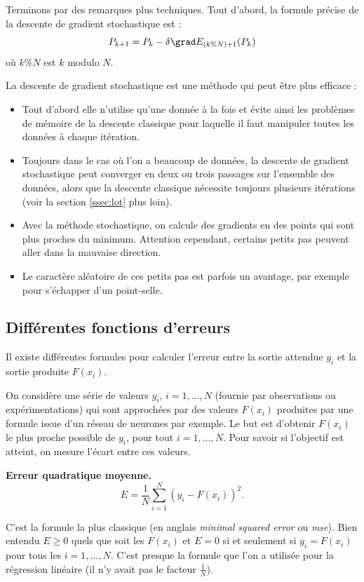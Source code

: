 Terminons par des remarques plus techniques.
Tout d'abord, la formule précise de la descente de gradient stochastique est :
$$P_{k+1} = P_k - \delta \grad E_{(k \% N)+1} (P_k)$$
où $k \% N$ est \og{}$k$ modulo $N$\fg{}.



La descente de gradient stochastique est une méthode qui peut être plus efficace : 
\begin{itemize}
	\item Tout d'abord elle n'utilise qu'une donnée à la fois et évite ainsi les problèmes de mémoire de la descente classique pour laquelle il faut manipuler toutes les données à chaque itération.
	\item Toujours dans le cas où l'on a beaucoup de données, la descente de gradient stochastique peut converger en deux ou trois passages sur l'ensemble des données, alors que la descente classique nécessite toujours plusieurs itérations (voir la section \ref{ssec:lot} plus loin).
	\item Avec la méthode stochastique, on calcule des gradients en des points qui sont plus proches du minimum. Attention cependant, certains petits pas peuvent aller dans la mauvaise direction.
	\item Le caractère aléatoire de ces petits pas est parfois un avantage, par exemple pour s'échapper d'un point-selle.
\end{itemize}






\subsection{Différentes fonctions d'erreurs}

Il existe différentes formules pour calculer l'erreur entre la sortie attendue $y_i$ et la sortie produite $F(x_i)$.

On considère une série de valeurs $y_i$, $i=1,\ldots,N$ (fournie par observations ou expérimentations) qui sont approchées par des valeurs $F(x_i)$ produites par une formule issue d'un réseau de neurones par exemple.
Le but est d'obtenir $F(x_i)$ le plus proche possible de $y_i$, pour tout $i=1,\ldots,N$. Pour savoir si l'objectif est atteint, on mesure l'écart entre ces valeurs.

\textbf{Erreur quadratique moyenne.}
$$E = \frac{1}{N} \sum_{i=1}^N (y_i-F(x_i))^2.$$

C'est la formule la plus classique (en anglais \emph{minimal squared error} ou \emph{mse}). 
Bien entendu $E\ge0$ quels que soit les $F(x_i)$ et $E=0$ si et seulement si $y_i=F(x_i)$ pour tous les $i=1,\ldots,N$. 
C'est presque la formule que l'on a utilisée pour la régression linéaire (il n'y avait pas le facteur $\frac1N$).

